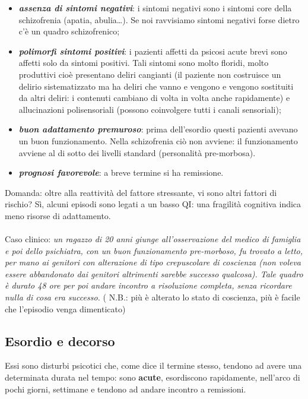 \begin{itemize}
\item
  \textbf{\emph{assenza di sintomi negativi}}: i sintomi negativi sono i
  sintomi core della schizofrenia (apatia, abulia\ldots{}). Se noi
  ravvisiamo sintomi negativi forse dietro c'è un quadro schizofrenico;
\item
  \textbf{\emph{polimorfi sintomi positivi}}: i pazienti affetti da
  psicosi acute brevi sono affetti solo da sintomi positivi. Tali
  sintomi sono molto floridi, molto produttivi cioè presentano deliri
  cangianti (il paziente non costruisce un delirio sistematizzato ma ha
  deliri che vanno e vengono e vengono sostituiti da altri deliri: i
  contenuti cambiano di volta in volta anche rapidamente) e
  allucinazioni polisensoriali (possono coinvolgere tutti i canali
  sensoriali);
\item
  \textbf{\emph{buon adattamento premuroso}}: prima dell'esordio questi
  pazienti avevano un buon funzionamento. Nella schizofrenia ciò non
  avviene: il funzionamento avviene al di sotto dei livelli standard
  (personalità pre-morbosa).
\item
  \textbf{\emph{prognosi favorevole}}: a breve termine si ha remissione.
\end{itemize}

Domanda: oltre alla reattività del fattore stressante, vi sono altri
fattori di rischio? Sì, alcuni episodi sono legati a un basso QI: una
fragilità cognitiva indica meno risorse di adattamento.
\\\\
Caso clinico: \emph{un ragazzo di 20 anni giunge all'osservazione del
medico di famiglia e poi dello psichiatra, con un buon funzionamento
pre-morboso, fu trovato a letto, per mano ai genitori con alterazione di
tipo crepuscolare di coscienza (non voleva essere abbandonato dai
genitori altrimenti sarebbe successo qualcosa). Tale quadro è durato 48
ore per poi andare incontro a risoluzione completa, senza ricordare
nulla di cosa era successo.} ( N.B.: più è alterato lo stato di
coscienza, più è facile che l'episodio venga dimenticato)

\subsection{Esordio e decorso}

Essi sono disturbi psicotici che, come dice il termine stesso, tendono
ad avere una determinata durata nel tempo: sono \textbf{acute},
esordiscono rapidamente, nell'arco di pochi giorni, settimane e tendono
ad andare incontro a remissioni.

